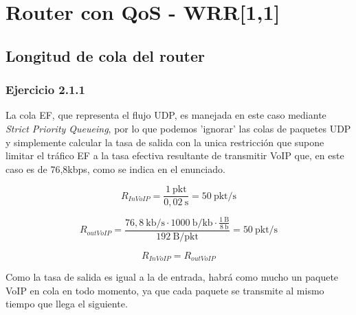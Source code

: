 \chapter{Router con QoS - WRR[1,1]}
\label{chap:conqoswrr11}

\section{Longitud de cola del router}

\subsection{Ejercicio 2.1.1}

\renewcommand{\theenumi}{\alph{enumi}}

La cola EF, que representa el flujo UDP, es manejada en este caso mediante \textit{Strict Priority Queueing},
por lo que podemos 'ignorar' las colas de paquetes UDP y simplemente calcular la tasa de salida con la
unica restricción que supone limitar el tráfico EF a la tasa efectiva resultante de transmitir VoIP que, 
en este caso es de 76,8kbps, como se indica en el enunciado.

\[
\label{eq:voip_tasa_entrada_VoIP}
R_{InVoIP} = \frac{1~\text{pkt}}{0,02~\text{s}} = 50 ~ \text{pkt/s}
\]

\[
\label{eq:voip_tasa_salida_VoIP}
R_{outVoIP} = \frac{76,8~\text{kb/s} \cdot 1000~\text{b/kb} \cdot \frac{1~\text{B}}{8~\text{b}}}{ 192~\text{B/pkt}} = 50~\text{pkt/s}
\]

\[
\label{eq:voip_comparacion_tasas_VoIP}
R_{InVoIP} = R_{outVoIP}
\]

Como la tasa de salida es igual a la de entrada, habrá como mucho un paquete VoIP en
cola en todo momento, ya que cada paquete se transmite al mismo tiempo que llega el siguiente.

\vspace{0,3cm}

